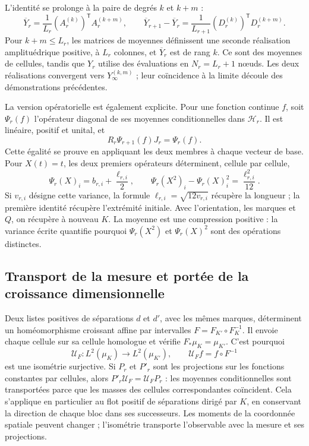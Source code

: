 L'identité se prolonge à la paire de degrés \(k\) et \(k+m\) :
\[
 \overline Y_r=\frac1{L_r}(A_r^{(k)})^{\mathsf T}A_r^{(k+m)},
 \qquad
 \overline Y_{r+1}-\overline Y_r
 =\frac1{L_{r+1}}(D_r^{(k)})^{\mathsf T}D_r^{(k+m)}.
\]
Pour \(k+m\leq L_r\), les matrices de moyennes définissent une
seconde réalisation amplituédrique positive, à \(L_r\) colonnes,
et \(\overline Y_r\) est de rang \(k\). Ce sont des moyennes de cellules,
tandis que \(Y_r\) utilise des évaluations en \(N_r=L_r+1\) nœuds. Les deux
réalisations convergent vers \(Y_\infty^{(k,m)}\) ; leur coïncidence
à la limite découle des démonstrations précédentes.

La version opératorielle est également explicite. Pour une fonction continue \(f\), soit \(\Psi_r(f)\) l'opérateur diagonal de ses moyennes conditionnelles dans \(\mathcal H_r\). Il est linéaire, positif et unital, et
\[
 R_r\Psi_{r+1}(f)J_r=\Psi_r(f).
\]
Cette égalité se prouve en appliquant les deux membres à chaque vecteur de base.
Pour \(X(t)=t\), les deux premiers opérateurs déterminent, cellule par
cellule,
\[
 \Psi_r(X)_i=b_{r,i}+\frac{\ell_{r,i}}2,\qquad
 \Psi_r(X^2)_i-\Psi_r(X)_i^2=\frac{\ell_{r,i}^2}{12}.
\]
Si \(v_{r,i}\) désigne cette variance, la formule \(\ell_{r,i}=\sqrt{12v_{r,i}}\) récupère la longueur ; la première identité récupère l'extrémité initiale. Avec l'orientation, les marques et \(Q\), on récupère à nouveau \(K\). La moyenne est une compression positive : la variance écrite quantifie pourquoi \(\Psi_r(X^2)\) et \(\Psi_r(X)^2\) sont des opérations distinctes.

\subsection{Transport de la mesure et portée de la croissance dimensionnelle}

Deux listes positives de séparations \(d\) et \(d'\), avec les
mêmes marques, déterminent un homéomorphisme croissant affine par intervalles
\(F=F_{K'}\circ F_K^{-1}\). Il envoie chaque cellule sur sa cellule homologue
et vérifie \(F_*\mu_K=\mu_{K'}\). C’est pourquoi
\[
 \mathcal U_F:L^2(\mu_K)\longrightarrow L^2(\mu_{K'}),
 \qquad\mathcal U_F f=f\circ F^{-1}
\]
est une isométrie surjective. Si \(P_r\) et \(P'_r\) sont les projections sur les fonctions constantes par cellules, alors \(P'_r\mathcal U_F=\mathcal U_FP_r\) : les moyennes conditionnelles sont transportées parce que les masses des cellules correspondantes coïncident. Cela s'applique en particulier au flot positif de séparations dirigé par \(K\), en conservant la direction de chaque bloc dans ses successeurs. Les moments de la coordonnée spatiale peuvent changer ; l'isométrie transporte l'observable avec la mesure et ses projections.

